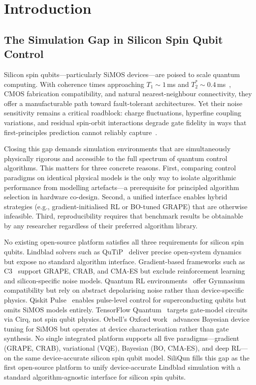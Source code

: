 
\section{Introduction}
\label{sec:introduction}

\subsection{The Simulation Gap in Silicon Spin Qubit Control}
\label{subsec:simulation_gap}

Silicon spin qubits—particularly SiMOS devices—are poised to scale quantum
computing. With coherence times approaching $T_1 \sim 1$\,ms and
$T_2^* \sim 0.4$\,ms~\cite{Xue2022,Noiri2022,Philips2022}, CMOS
fabrication compatibility, and natural nearest-neighbour connectivity, they
offer a manufacturable path toward fault-tolerant architectures. Yet their
noise sensitivity remains a critical roadblock: charge fluctuations, hyperfine
coupling variations, and residual spin-orbit interactions degrade gate fidelity
in ways that first-principles prediction cannot reliably
capture~\cite{Veldhorst2015,Fogarty2018}.

Closing this gap demands simulation environments that are simultaneously
physically rigorous and accessible to the full spectrum of quantum control
algorithms. This matters for three concrete reasons. First, comparing control
paradigms on identical physical models is the only way to isolate algorithmic
performance from modelling artefacts—a prerequisite for principled algorithm
selection in hardware co-design. Second, a unified interface enables hybrid
strategies (e.g., gradient-initialised RL or BO-tuned GRAPE) that are otherwise
infeasible. Third, reproducibility requires that benchmark results be obtainable
by any researcher regardless of their preferred algorithm library.

No existing open-source platform satisfies all three requirements for silicon
spin qubits. Lindblad solvers such as QuTiP~\cite{Johansson2012,Johansson2013} deliver precise
open-system dynamics but expose no standard algorithm interface. Gradient-based
frameworks such as C3~\cite{Wittler2021} support GRAPE, CRAB, and CMA-ES but
exclude reinforcement learning and silicon-specific noise models. Quantum RL
environments~\cite{VanDerLinde2023,QiskitGym2024} offer Gymnasium compatibility
but rely on abstract depolarising noise rather than device-specific physics.
Qiskit Pulse~\cite{Alexander2020} enables pulse-level control for
superconducting qubits but omits SiMOS models entirely. TensorFlow
Quantum~\cite{Broughton2020} targets gate-model circuits via Cirq, not spin
qubit physics. Orbell's Oxford work~\cite{Orbell2024} advances Bayesian device
tuning for SiMOS but operates at device characterisation rather than gate
synthesis. No single integrated platform supports all five paradigms—gradient
(GRAPE, CRAB), variational (VQE), Bayesian (BO, CMA-ES), and deep RL—on the
same device-accurate silicon spin qubit model. SiliQun fills this gap as the
first open-source platform to unify device-accurate Lindblad simulation with a
standard algorithm-agnostic interface for silicon spin qubits.

